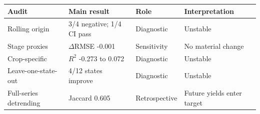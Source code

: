 \begin{tabular}{p{}p{}p{}p{}}
\toprule
Audit & Main result & Role & Interpretation \\
\midrule
Rolling origin & 3/4 negative; 1/4 CI pass & Diagnostic & Unstable \\
Stage proxies & $\Delta$RMSE -0.001 & Sensitivity & No material change \\
Crop-specific & $R^2$ -0.273 to 0.072 & Diagnostic & Unstable \\
Leave-one-state-out & 4/12 states improve & Diagnostic & Unstable \\
Full-series detrending & Jaccard 0.605 & Retrospective & Future yields enter target \\
\bottomrule
\end{tabular}
